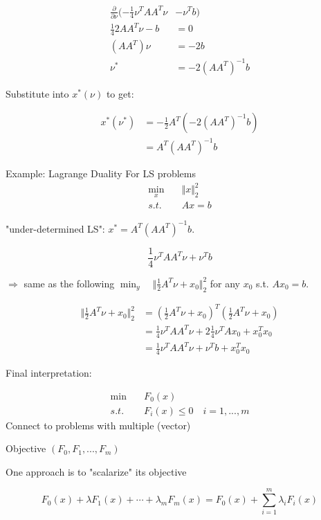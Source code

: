 \begin{align*}
\frac{\partial}{\partial \nu}(-\frac{1}{4}\nu^TAA^T\nu &- \nu^Tb)\\
\frac{1}{4}2AA^T\nu - b &= 0\\
(AA^T)\nu &= -2b\\
\nu^* &= -2(AA^T)^{-1}b
\end{align*}

Substitute into $x^*(\nu)$ to get:

\begin{align*}
x^*(\nu^*) &= -\frac{1}{2}A^T(-2(AA^T)^{-1}b)\\
&= A^T(AA^T)^{-1}b
\end{align*}

Example: Lagrange Duality For LS problems
\begin{align*}
\min_x \quad & \Vert x\Vert^2_2\\
s.t. \quad & Ax = b
\end{align*}

"under-determined LS": $x^* = A^T(AA^T)^{-1}b$.

\begin{equation*}
\frac{1}{4}\nu^TAA^T\nu+\nu^Tb
\end{equation*}

$\Rightarrow$ same as the following $\min_y\quad \Vert\frac{1}{2}A^T\nu + x_0\Vert^2_2$ for any $x_0$ s.t. $Ax_0 = b$.

\begin{align*}
\Vert \frac{1}{2}A^T\nu + x_0\Vert_2^2 &= (\frac{1}{2}A^T\nu+x_0)^T(\frac{1}{2}A^T\nu+x_0)\\
&= \frac{1}{4}\nu^TAA^T\nu + 2\frac{1}{4}\nu^TAx_0 + x_0^Tx_0\\
&= \frac{1}{4}\nu^TAA^T\nu + \nu^Tb+x_0^Tx_0
\end{align*}

Final interpretation:

\begin{align*}
\min \quad & F_0(x)\\
s.t. \quad & F_i(x)\leq 0\quad i = 1,...,m
\end{align*}
Connect to problems with multiple (vector)

Objective $(F_0,F_1,...,F_m)$

One approach is to "scalarize" its objective

\begin{equation*}
F_0(x) + \lambda F_1(x) + \cdots + \lambda_mF_m(x) = F_0(x) + \sum^m_{i=1}\lambda_iF_i(x)
\end{equation*}



